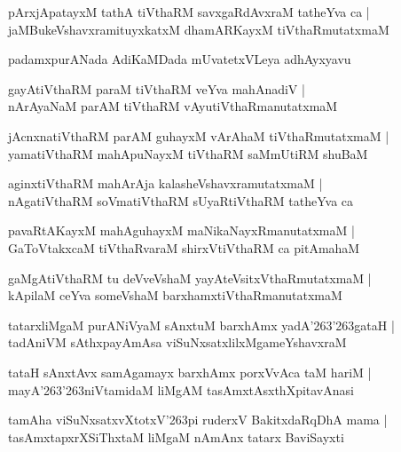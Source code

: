 \documentclass[twoside,12pt,openright]{book}
\def\S{\char'263}
\newcounter{shloka}[chapter]
\begin{document}
\begin{shloka}
pArxjApatayxM tathA tiVthaRM savxgaRdAvxraM tatheYva ca |\\
jaMBukeVshavxramituyxkatxM dhamARKayxM tiVthaRmutatxmaM 
\end{shloka}

\begin{center}
padamxpurANada AdiKaMDada mUvatetxVLeya adhAyxyavu
\end{center}

\begin{shloka}
gayAtiVthaRM paraM tiVthaRM veYva mahAnadiV |\\
nArAyaNaM parAM tiVthaRM vAyutiVthaRmanutatxmaM 
\end{shloka}

\begin{shloka}
jAcnxnatiVthaRM parAM guhayxM vArAhaM tiVthaRmutatxmaM |\\
yamatiVthaRM mahApuNayxM tiVthaRM saMmUtiRM shuBaM 
\end{shloka}

\begin{shloka}
aginxtiVthaRM mahArAja kalasheVshavxramutatxmaM |\\
nAgatiVthaRM soVmatiVthaRM sUyaRtiVthaRM tatheYva ca 
\end{shloka}

\begin{shloka}
pavaRtAKayxM mahAguhayxM maNikaNayxRmanutatxmaM |\\
GaToVtakxcaM tiVthaRvaraM shirxVtiVthaRM ca pitAmahaM 
\end{shloka}

\begin{shloka}
gaMgAtiVthaRM tu deVveVshaM yayAteVsitxVthaRmutatxmaM |\\
kApilaM ceYva someVshaM barxhamxtiVthaRmanutatxmaM 
\end{shloka}

\begin{shloka}
tatarxliMgaM purANiVyaM sAnxtuM barxhAmx yadA\S \S gataH |\\
tadAniVM sAthxpayAmAsa viSuNxsatxlilxMgameYshavxraM 
\end{shloka}

\begin{shloka}
tataH sAnxtAvx samAgamayx barxhAmx porxVvAca taM hariM |\\
mayA\S\S niVtamidaM liMgAM tasAmxtAsxthXpitavAnasi 
\end{shloka}

\begin{shloka}
tamAha viSuNxsatxvXtotxV\S pi ruderxV BakitxdaRqDhA mama |\\
tasAmxtapxrXSiThxtaM liMgaM nAmAnx tatarx BaviSayxti 
\end{shloka}
\end{document}
